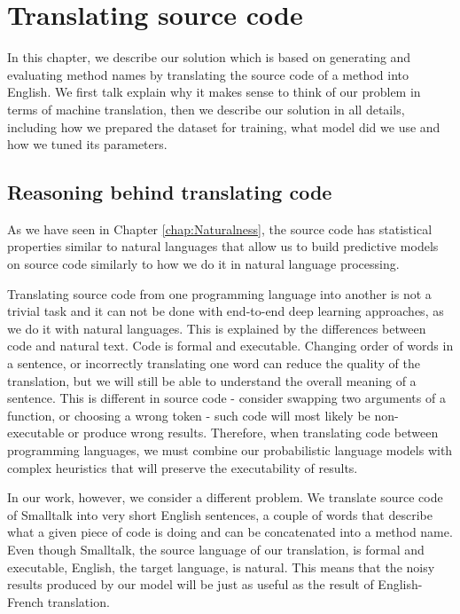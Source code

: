 \chapter{Translating source code}
\label{chap:TranslatingCode}
\mtoc

In this chapter, we describe our solution which is based on generating and evaluating method names by translating the source code of a method into English. We first talk explain why it makes sense to think of our problem in terms of machine translation, then we describe our solution in all details, including how we prepared the dataset for training, what model did we use and how we tuned its parameters.


\section{Reasoning behind translating code}
\label{sec:TranslatingCode-Reasoning}

As we have seen in Chapter \ref{chap:Naturalness}, the source code has statistical properties similar to natural languages that allow us to build predictive models on source code similarly to how we do it in natural language processing.

Translating source code from one programming language into another is not a trivial task and it can not be done with end-to-end deep learning approaches, as we do it with natural languages. This is explained by the differences between code and natural text. Code is formal and executable. Changing order of words in a sentence, or incorrectly translating one word can reduce the quality of the translation, but we will still be able to understand the overall meaning of a sentence. This is different in source code - consider swapping two arguments of a function, or choosing a wrong token - such code will most likely be non-executable or produce wrong results. Therefore, when translating code between programming languages, we must combine our probabilistic language models with complex heuristics that will preserve the executability of results.

In our work, however, we consider a different problem. We translate source code of Smalltalk into very short English sentences, a couple of words that describe what a given piece of code is doing and can be concatenated into a method name. Even though Smalltalk, the source language of our translation, is formal and executable, English, the target language, is natural. This means that the noisy results produced by our model will be just as useful as the result of English-French translation.

